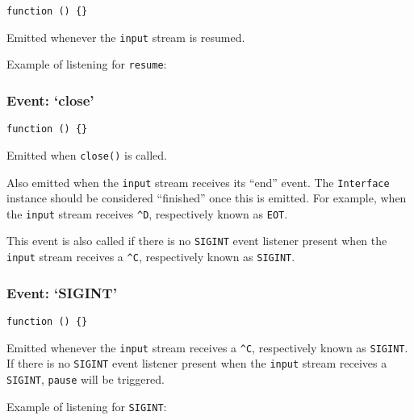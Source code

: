 \texttt{function\ ()\ \{\}}

Emitted whenever the \texttt{input} stream is resumed.

Example of listening for \texttt{resume}:

\begin{Shaded}
\begin{Highlighting}[]
\NormalTok{(}\NormalTok{, }\NormalTok{() \{}
  \NormalTok{(}\NormalTok{);}
\NormalTok{\});}
\end{Highlighting}
\end{Shaded}

\subsubsection{\texorpdfstring{Event:
`close'}{Event: close}}\label{event-close}

\texttt{function\ ()\ \{\}}

Emitted when \texttt{close()} is called.

Also emitted when the \texttt{input} stream receives its ``end'' event.
The \texttt{Interface} instance should be considered ``finished'' once
this is emitted. For example, when the \texttt{input} stream receives
\texttt{\^{}D}, respectively known as \texttt{EOT}.

This event is also called if there is no \texttt{SIGINT} event listener
present when the \texttt{input} stream receives a \texttt{\^{}C},
respectively known as \texttt{SIGINT}.

\subsubsection{\texorpdfstring{Event:
`SIGINT'}{Event: SIGINT}}\label{event-sigint}

\texttt{function\ ()\ \{\}}

Emitted whenever the \texttt{input} stream receives a \texttt{\^{}C},
respectively known as \texttt{SIGINT}. If there is no \texttt{SIGINT}
event listener present when the \texttt{input} stream receives a
\texttt{SIGINT}, \texttt{pause} will be triggered.

Example of listening for \texttt{SIGINT}:

\begin{Shaded}
\begin{Highlighting}[]
\NormalTok{(}\NormalTok{, }\NormalTok{() \{}
  \NormalTok{(}\NormalTok{, }
     \NormalTok{(}\NormalTok{(}\OtherTok{/}\FloatTok{^}\FloatTok{(}\NormalTok{)) }\NormalTok{();}
  \NormalTok{\});}
\NormalTok{\});}
\end{Highlighting}
\end{Shaded}

